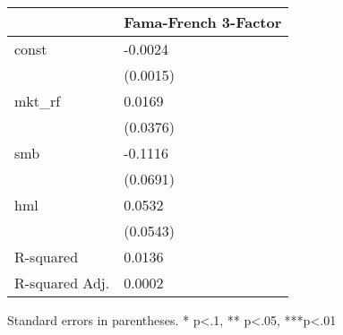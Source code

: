 \begin{table}
\caption{}
\label{}
\begin{center}
\begin{tabular}{ll}
\hline
               & Fama-French 3-Factor  \\
\hline
const          & -0.0024               \\
               & (0.0015)              \\
mkt\_rf        & 0.0169                \\
               & (0.0376)              \\
smb            & -0.1116               \\
               & (0.0691)              \\
hml            & 0.0532                \\
               & (0.0543)              \\
R-squared      & 0.0136                \\
R-squared Adj. & 0.0002                \\
\hline
\end{tabular}
\end{center}
\end{table}
\bigskip
Standard errors in parentheses. \newline 
* p<.1, ** p<.05, ***p<.01